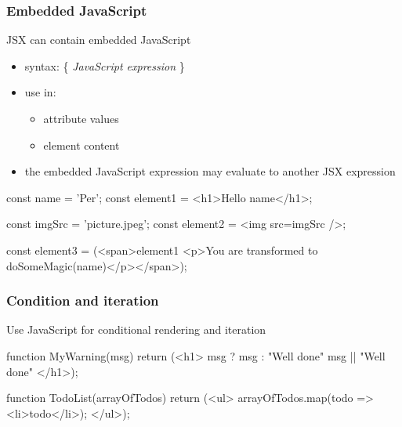 \begin{frame}[fragile] \frametitle{Embedded JavaScript}
JSX can contain embedded JavaScript
\begin{itemize}
  \item syntax: \{ \emph{JavaScript expression} \}
  \item use in:
  \begin{itemize}
    \item attribute values
    \item element content
  \end{itemize}
  \item the embedded JavaScript expression may evaluate to another JSX expression
\end{itemize}
\vspace{3mm}
\begin{CodeBox}{}
const name = 'Per';
const element1 = <h1>Hello {name}</h1>;

const imgSrc = 'picture.jpeg';
const element2 = <img src={imgSrc} />;

const element3 = (<span>{element1}
  <p>You are transformed to {doSomeMagic(name)}</p></span>);
\end{CodeBox}
\end{frame}

\begin{frame}[fragile] \frametitle{Condition and iteration}
Use JavaScript for conditional rendering and iteration
\begin{CodeBox}{}
function MyWarning({msg}) {
  return (<h1>
               {msg ? msg : "Well done" }
               {msg || "Well done" }
           </h1>);
}

function TodoList({arrayOfTodos}) {
  return (<ul>
              {arrayOfTodos.map(todo => <li>{todo}</li>)};
            </ul>);
}
\end{CodeBox}
\end{frame}

